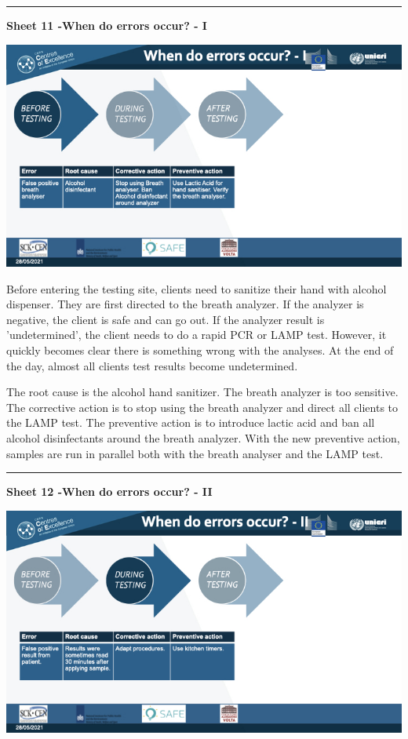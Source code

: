 \documentclass[
]{book}
\begin{document}
\begin{center}\rule{0.5\linewidth}{0.5pt}\end{center}

\textbf{Sheet 11 -When do errors occur? - I}

\includegraphics{images/m04/m04_Quality_management_v3.011.jpeg}

Before entering the testing site, clients need to sanitize their hand
with alcohol dispenser. They are first directed to the breath analyzer.
If the analyzer is negative, the client is safe and can go out. If the
analyzer result is 'undetermined', the client needs to do a rapid PCR
or LAMP test. However, it quickly becomes clear there is something wrong
with the analyses. At the end of the day, almost all clients test
results become undetermined.

The root cause is the alcohol hand sanitizer. The breath analyzer is too
sensitive. The corrective action is to stop using the breath analyzer
and direct all clients to the LAMP test. The preventive action is to
introduce lactic acid and ban all alcohol disinfectants around the
breath analyzer. With the new preventive action, samples are run in
parallel both with the breath analyser and the LAMP test.

\begin{center}\rule{0.5\linewidth}{0.5pt}\end{center}

\textbf{Sheet 12 -When do errors occur? - II}

\includegraphics{images/m04/m04_Quality_management_v3.012.jpeg}
\end{document}
